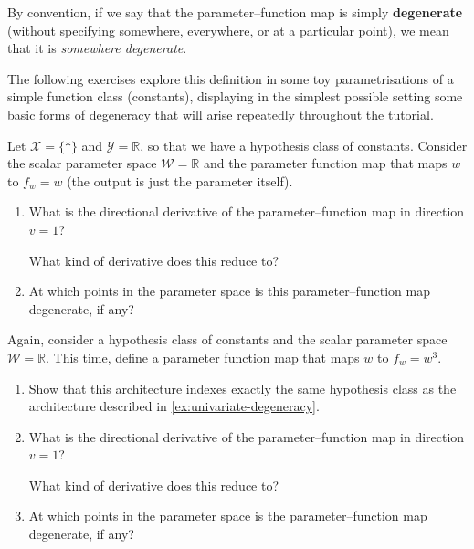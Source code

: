 \documentclass[11pt]{article}
\newcommand{\R}{\mathbb{R}}
\newcommand{\X}{\mathcal{X}}
\newcommand{\Y}{\mathcal{Y}}
\newcommand{\W}{\mathcal{W}}
\begin{document}
By convention, if we say that the parameter--function map is simply
\textbf{degenerate} (without specifying somewhere, everywhere, or at a
particular point), we mean that it is \emph{somewhere degenerate}.

The following exercises explore this definition in some toy parametrisations of a simple function class (constants), displaying in the simplest possible setting some basic forms of degeneracy that will arise repeatedly throughout the tutorial.

\begin{exercise}
\label{ex:univariate-degeneracy}
Let $\X = \{\ast\}$ and $\Y = \R$, so that we have a hypothesis class of constants. Consider the scalar parameter space $\W = \R$ and the parameter function map that maps $w$ to $f_w = w$ (the output is just the parameter itself).
\begin{enumerate}
    \item What is the directional derivative of the parameter--function map in
        direction $v = 1$?
    \begin{hint}
What kind of derivative does this reduce to?
    \end{hint}
    \item At which points in the parameter space is this parameter--function map degenerate, if any?
\end{enumerate}
\end{exercise}

\begin{exercise}
\label{ex:cubic-degeneracy}
Again, consider a hypothesis class of constants and the scalar parameter space $\W = \R$. This time, define a parameter function map that maps $w$ to $f_w = w^3$.
\begin{enumerate}
    \item Show that this architecture indexes exactly the same hypothesis class as the architecture described in \cref{ex:univariate-degeneracy}.
    \item What is the directional derivative of the parameter--function map in
        direction $v = 1$?
    \begin{hint}
What kind of derivative does this reduce to?
    \end{hint}
    \item At which points in the parameter space is the parameter--function map degenerate, if any?
\end{enumerate}
\end{exercise}
\end{document}
